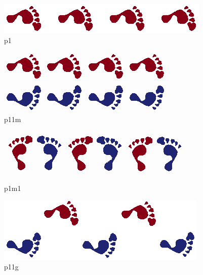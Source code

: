 \documentclass[class=article, crop=false]{standalone}
\begin{document}
\begin{subfigure}{0.21\linewidth}
        \centering
		\includegraphics[width=\linewidth, angle=90]{images/frieze-groups/frieze_hop.png}
		\caption{p1}
		\label{fig:p1}
	\end{subfigure}
	\begin{subfigure}{0.21\linewidth}
        \centering
		\includegraphics[width=\linewidth,angle=90]{images/frieze-groups/Frieze_jump.png}
		\caption{p11m}
		\label{fig:p11m}
	\end{subfigure}
	\begin{subfigure}{0.21\linewidth}
            \centering
	        \includegraphics[width=\linewidth,angle=90]{images/frieze-groups/Frieze_sidle.png}
	        \caption{p1m1}
	        \label{fig:p1m1}
    \end{subfigure}
    \begin{subfigure}{0.21\linewidth}
            \centering
	        \includegraphics[width=\linewidth,angle=90]{images/frieze-groups/Frieze_step.png}
	        \caption{p11g}
	        \label{fig:p11g}
    \end{subfigure}
\end{document}
